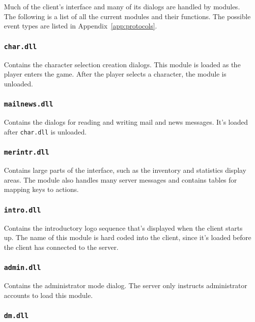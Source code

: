 Much of the client's interface and many of its dialogs are handled by
modules.  The following is a list of all the current modules and their
functions.  The possible event types are listed in
Appendix~\ref{app:protocols}.

\subsubsection{{\tt char.dll}}

Contains the character selection creation dialogs.  This module is
loaded as the player enters the game.  After the player selects a
character, the module is unloaded.

\subsubsection{{\tt mailnews.dll}}

Contains the dialogs for reading and writing mail and news messages.
It's loaded after {\tt char.dll} is unloaded.

\subsubsection{{\tt merintr.dll}}

Contains large parts of the interface, such as the inventory and
statistics display areas.  The module also handles many server
messages and contains tables for mapping keys to actions.

\subsubsection{{\tt intro.dll}}

Contains the introductory logo sequence that's displayed when the
client starts up.  The name of this module is hard coded into the
client, since it's loaded before the client has connected to the
server.

\subsubsection{{\tt admin.dll}}

Contains the administrator mode dialog.  The server only instructs
administrator accounts to load this module.

\subsubsection{{\tt dm.dll}}

